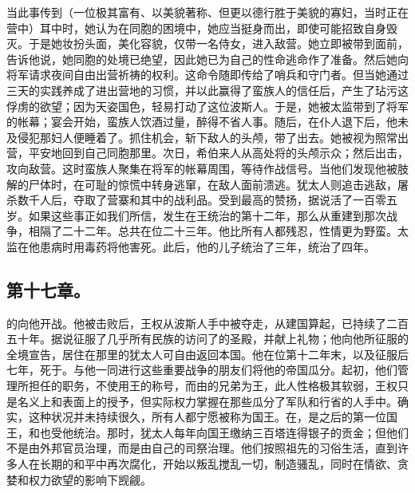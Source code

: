 当此事传到（一位极其富有、以美貌著称、但更以德行胜于美貌的寡妇，当时正在营中）耳中时，她认为在同胞的困境中，她应当挺身而出，即使可能招致自身毁灭。于是她妆扮头面，美化容貌，仅带一名侍女，进入敌营。她立即被带到面前，告诉他说，她同胞的处境已绝望，因此她已为自己的性命逃命作了准备。然后她向将军请求夜间自由出营祈祷的权利。这命令随即传给了哨兵和守门者。但当她通过三天的实践养成了进出营地的习惯，并以此赢得了蛮族人的信任后，产生了玷污这俘虏的欲望；因为天姿国色，轻易打动了这位波斯人。于是，她被太监带到了将军的帐幕；宴会开始，蛮族人饮酒过量，醉得不省人事。随后，在仆人退下后，他未及侵犯那妇人便睡着了。抓住机会，斩下敌人的头颅，带了出去。她被视为照常出营，平安地回到自己同胞那里。次日，希伯来人从高处将的头颅示众；然后出击，攻向敌营。这时蛮族人聚集在将军的帐幕周围，等待作战信号。当他们发现他被肢解的尸体时，在可耻的惊慌中转身逃窜，在敌人面前溃逃。犹太人则追击逃敌，屠杀数千人后，夺取了营寨和其中的战利品。受到最高的赞扬，据说活了一百零五岁。如果这些事正如我们所信，发生在王统治的第十二年，那么从重建到那次战争，相隔了二十二年。总共在位二十三年。他比所有人都残忍，性情更为野蛮。太监在他患病时用毒药将他害死。此后，他的儿子统治了三年，统治了四年。\par


\subsection{第十七章。}

的向他开战。他被击败后，王权从波斯人手中被夺走，从建国算起，已持续了二百五十年。据说征服了几乎所有民族的访问了的圣殿，并献上礼物；他向他所征服的全境宣告，居住在那里的犹太人可自由返回本国。他在位第十二年末，以及征服后七年，死于。与他一同进行这些重要战争的朋友们将他的帝国瓜分。起初，他们管理所担任的职务，不使用王的称号，而由的兄弟为王，此人性格极其软弱，王权只是名义上和表面上的授予，但实际权力掌握在那些瓜分了军队和行省的人手中。确实，这种状况并未持续很久，所有人都宁愿被称为国王。在，是之后的第一位国王，和也受他统治。那时，犹太人每年向国王缴纳三百塔连得银子的贡金；但他们不是由外邦官员治理，而是由自己的司祭治理。他们按照祖先的习俗生活，直到许多人在长期的和平中再次腐化，开始以叛乱搅乱一切，制造骚乱，同时在情欲、贪婪和权力欲望的影响下觊觎。\par

